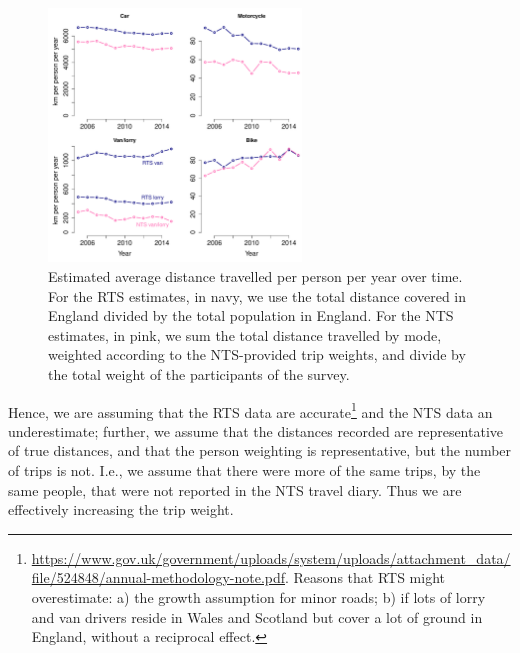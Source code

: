 \documentclass{article}
\begin{document}
\begin{figure}[!b]
\centering
\includegraphics[width=0.6\textwidth]{NTSvsTRA.pdf}
\caption[Estimated average distance travelled per person per year over time.]{\small Estimated average distance travelled per person per year over time. For the RTS estimates, in navy, we use the total distance covered in England divided by the total population in England. For the NTS estimates, in pink, we sum the total distance travelled by mode, weighted according to the NTS-provided trip weights, and divide by the total weight of the participants of the survey.}
\label{total}
\end{figure}


Hence, we are assuming that the RTS data are accurate\footnote{\url{https://www.gov.uk/government/uploads/system/uploads/attachment_data/file/524848/annual-methodology-note.pdf}. Reasons that RTS might overestimate: a) the growth assumption for minor roads; b) if lots of lorry and van drivers reside in Wales and Scotland but cover a lot of ground in England, without a reciprocal effect.} and the NTS data an underestimate; further, we assume that the distances recorded are representative of true distances, and that the person weighting is representative, but the number of trips is not. I.e., we assume that there were more of the same trips, by the same people, that were not reported in the NTS travel diary. Thus we are effectively increasing the trip weight. %
\end{document}
